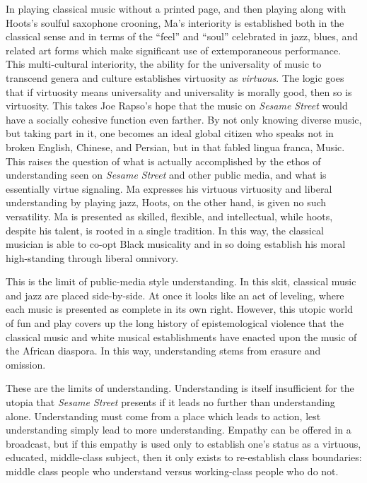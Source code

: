 \documentclass[12pt,letterpaper]{article}
\newcommand{\ses}{\textit{Sesame Street }}
\begin{document}
	In playing classical music without a printed page, and then playing 
	along with Hoots's soulful saxophone crooning, Ma's interiority is 
	established both in the classical sense and in terms of the ``feel'' and
	``soul'' celebrated in jazz, blues, and related art forms which make 
	significant use of extemporaneous performance. This multi-cultural 
	interiority, the ability for the universality of music to transcend 
	genera and culture establishes virtuosity as \textit{virtuous}.
	The logic goes that if virtuosity means universality and universality is
	morally good, then so is virtuosity. This takes Joe Rapso's hope that 
	the music on \textit{Sesame Street} would have a socially cohesive 
	function even farther. By not only knowing diverse music, but taking 
	part in it, one becomes an ideal global citizen who speaks not in broken
	English, Chinese, and Persian, but in that fabled lingua franca, Music.   
	This raises the question of what is actually accomplished by the ethos
	of understanding seen on \ses and other public media, and what is
	essentially virtue signaling. Ma expresses his virtuous virtuosity and 
	liberal understanding by playing jazz, Hoots, on the other hand, is 
	given no such versatility. Ma is presented as skilled, flexible, and 
	intellectual, while hoots, despite his talent, is rooted in a single 
	tradition. In this way, the classical musician is able to co-opt Black 
	musicality and in so doing establish his moral high-standing through 
	liberal omnivory. 

	This is the limit of public-media style understanding. In this skit, 
	classical music and jazz are placed side-by-side. At once it looks like
	an act of leveling, where each music is presented as complete in its own
	right. However, this utopic world of fun and play covers up the long 
	history of epistemological violence that the classical music and white 
	musical establishments have enacted upon the music of the African 
	diaspora. In this way, understanding stems from erasure and omission.

	These are the limits of understanding. Understanding is itself 
	insufficient for the utopia that \ses presents if it leads no further 
	than understanding alone. Understanding must come from a place which 
	leads to
	 action, lest understanding simply lead to more understanding. 
	Empathy can be offered in a 
	broadcast, but if this empathy is used only to establish one's status 
	as a virtuous, educated, middle-class subject, then it only exists to 
	re-establish class boundaries: middle class people who understand 
	versus working-class people who do not.  
	 
\end{document}
